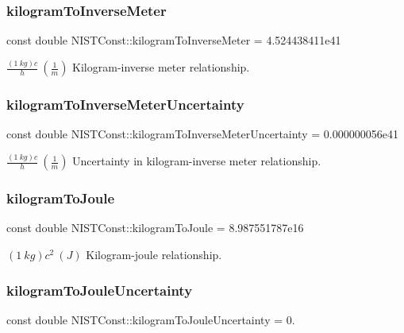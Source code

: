 \subsubsection{\texorpdfstring{kilogram\+To\+Inverse\+Meter}{kilogramToInverseMeter}}
{\footnotesize\ttfamily const double N\+I\+S\+T\+Const\+::kilogram\+To\+Inverse\+Meter = 4.\+524438411e41}

$\frac{(1\ kg)c}{h} \ (\frac{1}{m})$ Kilogram-\/inverse meter relationship. \mbox{\label{group___n_i_s_t_const-_kilogram_ga645bb9b0850ae8c2ac2fbf8d480bc013}} 
\subsubsection{\texorpdfstring{kilogram\+To\+Inverse\+Meter\+Uncertainty}{kilogramToInverseMeterUncertainty}}
{\footnotesize\ttfamily const double N\+I\+S\+T\+Const\+::kilogram\+To\+Inverse\+Meter\+Uncertainty = 0.\+000000056e41}

$\frac{(1\ kg)c}{h} \ (\frac{1}{m})$ Uncertainty in kilogram-\/inverse meter relationship. \mbox{\label{group___n_i_s_t_const-_kilogram_gaf3635d5c9747ebcd2edadf77388fea9b}} 
\subsubsection{\texorpdfstring{kilogram\+To\+Joule}{kilogramToJoule}}
{\footnotesize\ttfamily const double N\+I\+S\+T\+Const\+::kilogram\+To\+Joule = 8.\+987551787e16}

$(1\ kg)c^2 \ (J)$ Kilogram-\/joule relationship. \mbox{\label{group___n_i_s_t_const-_kilogram_gacf96db99d7b828aca5c24fda34406550}} 
\subsubsection{\texorpdfstring{kilogram\+To\+Joule\+Uncertainty}{kilogramToJouleUncertainty}}
{\footnotesize\ttfamily const double N\+I\+S\+T\+Const\+::kilogram\+To\+Joule\+Uncertainty = 0.}

